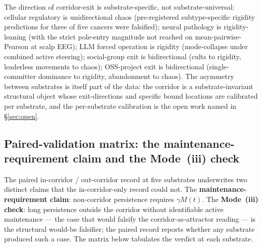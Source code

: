 \documentclass[11pt,a4paper]{article}
\begin{document}
The direction of corridor-exit is substrate-specific, not substrate-universal: cellular regulatory is unidirectional chaos (pre-registered subtype-specific rigidity predictions for three of five cancers were falsified); neural pathology is rigidity-leaning (with the strict pole-entry magnitude not reached on mean-pairwise-Pearson at scalp EEG); LLM forced operation is rigidity (mode-collapse under combined active steering); social-group exit is bidirectional (cults to rigidity, leaderless movements to chaos); OSS-project exit is bidirectional (single-committer dominance to rigidity, abandonment to chaos). The asymmetry between substrates is itself part of the data: the corridor is a substrate-invariant structural object whose exit-directions and specific bound locations are calibrated per substrate, and the per-substrate calibration is the open work named in \S\ref{sec:open}.

\subsection*{Paired-validation matrix: the maintenance-requirement claim and the Mode~(iii) check}\label{sec:paired-validation}

The paired in-corridor / out-corridor record at five substrates underwrites two distinct claims that the in-corridor-only record could not. The \textbf{maintenance-requirement claim}: non-corridor persistence requires $\gamma M(t)$. The \textbf{Mode~(iii) check}: long persistence outside the corridor without identifiable active maintenance --- the case that would falsify the corridor-as-attractor reading --- is the structural would-be falsifier; the paired record reports whether any substrate produced such a case. The matrix below tabulates the verdict at each substrate.
\end{document}
